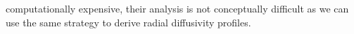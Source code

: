 computationally expensive, their analysis is not conceptually difficult as we can use the same strategy to derive radial diffusivity profiles.
